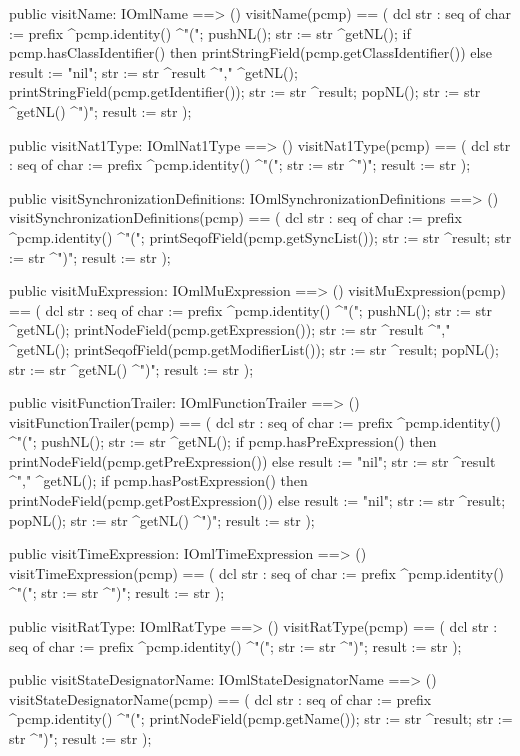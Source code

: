 \begin{vdm_al}
  public visitName: IOmlName ==> ()
  visitName(pcmp) ==
    ( dcl str : seq of char := prefix ^pcmp.identity() ^"(";
      pushNL();
      str := str ^getNL();
      if pcmp.hasClassIdentifier()
      then printStringField(pcmp.getClassIdentifier())
      else result := "nil";
      str := str ^result ^"," ^getNL();
      printStringField(pcmp.getIdentifier());
      str := str ^result;
      popNL();
      str := str ^getNL() ^")";
      result := str );

  public visitNat1Type: IOmlNat1Type ==> ()
  visitNat1Type(pcmp) ==
    ( dcl str : seq of char := prefix ^pcmp.identity() ^"(";
      str := str ^")";
      result := str );

  public visitSynchronizationDefinitions: IOmlSynchronizationDefinitions ==> ()
  visitSynchronizationDefinitions(pcmp) ==
    ( dcl str : seq of char := prefix ^pcmp.identity() ^"(";
      printSeqofField(pcmp.getSyncList());
      str := str ^result;
      str := str ^")";
      result := str );

  public visitMuExpression: IOmlMuExpression ==> ()
  visitMuExpression(pcmp) ==
    ( dcl str : seq of char := prefix ^pcmp.identity() ^"(";
      pushNL();
      str := str ^getNL();
      printNodeField(pcmp.getExpression());
      str := str ^result ^"," ^getNL();
      printSeqofField(pcmp.getModifierList());
      str := str ^result;
      popNL();
      str := str ^getNL() ^")";
      result := str );

  public visitFunctionTrailer: IOmlFunctionTrailer ==> ()
  visitFunctionTrailer(pcmp) ==
    ( dcl str : seq of char := prefix ^pcmp.identity() ^"(";
      pushNL();
      str := str ^getNL();
      if pcmp.hasPreExpression()
      then printNodeField(pcmp.getPreExpression())
      else result := "nil";
      str := str ^result ^"," ^getNL();
      if pcmp.hasPostExpression()
      then printNodeField(pcmp.getPostExpression())
      else result := "nil";
      str := str ^result;
      popNL();
      str := str ^getNL() ^")";
      result := str );

  public visitTimeExpression: IOmlTimeExpression ==> ()
  visitTimeExpression(pcmp) ==
    ( dcl str : seq of char := prefix ^pcmp.identity() ^"(";
      str := str ^")";
      result := str );

  public visitRatType: IOmlRatType ==> ()
  visitRatType(pcmp) ==
    ( dcl str : seq of char := prefix ^pcmp.identity() ^"(";
      str := str ^")";
      result := str );

  public visitStateDesignatorName: IOmlStateDesignatorName ==> ()
  visitStateDesignatorName(pcmp) ==
    ( dcl str : seq of char := prefix ^pcmp.identity() ^"(";
      printNodeField(pcmp.getName());
      str := str ^result;
      str := str ^")";
      result := str );


\end{vdm_al}
